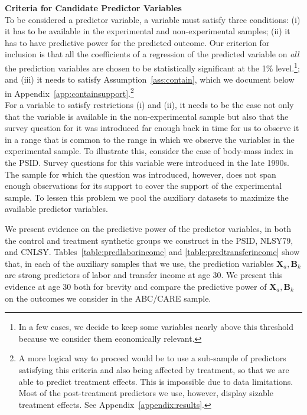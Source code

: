 \noindent \textbf{Criteria for Candidate Predictor Variables}\\
\noindent To be considered a predictor variable, a variable must satisfy three conditions: (i) it has to be available in the experimental and non-experimental samples; (ii) it has to have predictive power for the predicted outcome. Our criterion for inclusion is that all the coefficients of a regression of the predicted variable on \textit{all} the prediction variables are chosen to be statistically significant at the 1\% level.\footnote{In a few cases, we decide to keep some variables nearly above this threshold because we consider them economically relevant.}; and (iii) it needs to satisfy Assumption~\ref{ass:contain}, which we document below in Appendix~\ref{app:containsupport}.\footnote{A more logical way to proceed would be to use a sub-sample of predictors satisfying this criteria and also being affected by treatment, so that we are able to predict treatment effects. This is impossible due to data limitations. Most of the post-treatment predictors we use, however, display sizable treatment effects. See Appendix~\ref{appendix:results}.}\\

\noindent For a variable to satisfy restrictions (i) and (ii), it needs to be the case not only that the variable is available in the non-experimental sample but also that the survey question for it was introduced far enough back in time for us to observe it in a range that is common to the range in which we observe the variables in the experimental sample. To illustrate this, consider the case of body-mass index in the PSID. Survey questions for this variable were introduced in the late 1990s. The sample for which the question was introduced, however, does not span enough observations for its support to cover the support of the experimental sample. To lessen this problem we pool the auxiliary datasets to maximize the available predictor variables.

\noindent We present evidence on the predictive power of the predictor variables, in both the control and treatment synthetic groups we construct in the PSID, NLSY79, and CNLSY. Tables~\ref{table:predlaborincome} and \ref{table:predtransferincome} show that, in each of the auxiliary samples that we use, the prediction variables $\bm{X}_{a}, \bm{B}_k$ are strong predictors of labor and transfer income at age 30. We present this evidence at age 30 both for brevity and compare the predictive power of $\bm{X}_{a},\bm{B}_k$ on the outcomes we consider in the ABC/CARE sample.

